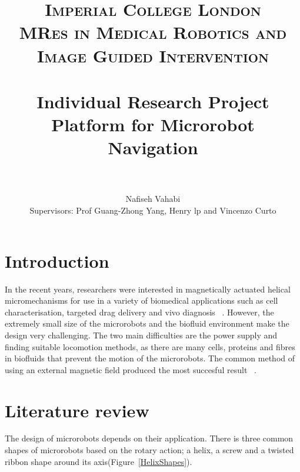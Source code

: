 \documentclass[a4paper,11pt]{article}
\title{
\normalfont \normalsize
\textsc{Imperial College London\\
MRes in Medical Robotics and Image Guided Intervention} \\ [1pt] %
\horrule{0.5pt} \\[0.4cm] %
\huge Individual Research Project \\
Platform for Microrobot Navigation \\ %
\horrule{2pt} \\[0.1cm] %
}
\author{
        Nafiseh Vahabi\\
	Supervisors: Prof Guang-Zhong Yang, Henry lp and Vincenzo Curto
}
\begin{document}



\begin{sloppypar}


\maketitle
\thispagestyle{plain}


\section{Introduction}

In the recent years, researchers were interested in magnetically actuated helical micromechanisms for use
 in a variety of biomedical applications such as cell characterisation, targeted drag delivery and vivo 
diagnosis ~\citep{peyer2013magnetic}. However, the extremely small size of the microrobots and the biofluid environment make the design 
very challenging. The two main difficulties are the power supply and finding suitable locomotion methods, as
 there are many cells, proteins and fibres in biofluids that prevent the motion of the microrobots. 
The common method of using an external magnetic field produced the most succesful result ~\citep{peyer2013bio}. 
\paragraph{}



\section{Literature review}
The design of microrobots depends on their application. There is three common shapes of microrobots 
based on the rotary action; a helix, a screw and a twisted ribbon shape around its axis(Figure~\ref{HelixShapes}). 


\end{sloppypar}
\end{document}
